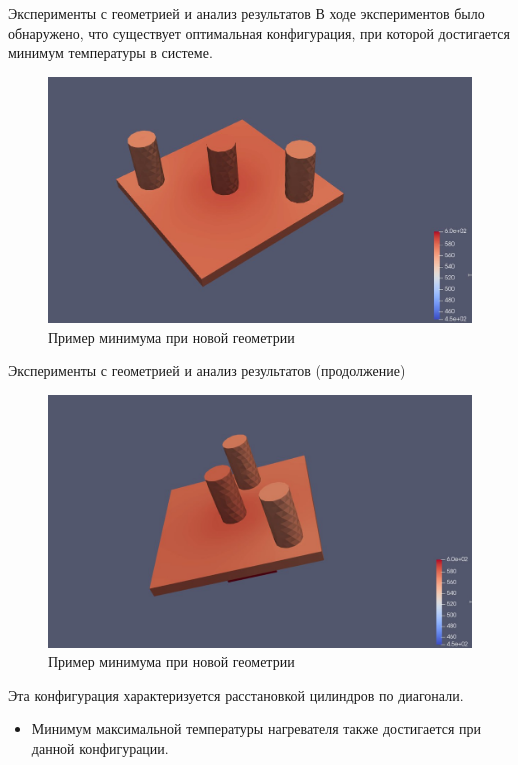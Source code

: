 \documentclass{beamer}
\begin{document}
\begin{frame}{Эксперименты с геометрией и анализ результатов}
	В ходе экспериментов было обнаружено, что существует оптимальная конфигурация, при которой достигается минимум температуры в системе.

	\begin{figure}[h]
		\centering
		\includegraphics[width=0.4\linewidth]{21.4.jpg}
		\caption{Пример минимума при новой геометрии}
	\end{figure}
\end{frame}

\begin{frame}{Эксперименты с геометрией и анализ результатов (продолжение)}
	\begin{figure}[h]
		\centering
		\includegraphics[width=0.4\linewidth]{21.5.jpg}
		\caption{Пример минимума при новой геометрии}
	\end{figure}

	Эта конфигурация характеризуется расстановкой цилиндров по диагонали.

	\vspace{1em}
	\begin{itemize}
		\item Минимум максимальной температуры нагревателя также достигается при данной конфигурации.
	\end{itemize}
\end{frame}
\end{document}
